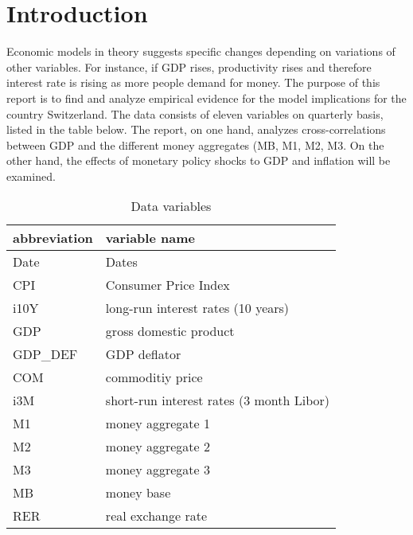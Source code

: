 \documentclass[11pt,a4paper]{report}
\begin{document}
\section*{Introduction}
Economic models in theory suggests specific changes depending on variations of other variables. For instance, if GDP rises, productivity rises and therefore interest rate is rising as more people demand for money. The purpose of this report is to find and analyze empirical evidence for the model implications for the country Switzerland. The data consists of eleven variables on quarterly basis, listed in the table below. The report, on one hand, analyzes cross-correlations between GDP and the different money aggregates (MB, M1, M2, M3. On the other hand, the effects of monetary policy shocks to GDP and inflation will be examined. 
\newline
\begin{table}[H]
\centering
\caption{Data variables}
\label{tab: var}
\begin{tabular}{l|l}
	\textbf{abbreviation} & \textbf{variable name}\\\hline\hline
	Date & Dates\\
	CPI & Consumer Price Index \\
	i10Y & long-run interest rates (10 years) \\
	GDP & gross domestic product\\
	GDP\_DEF & GDP deflator \\
	COM & commoditiy price \\
	i3M & short-run interest rates (3 month Libor) \\
	M1 & money aggregate 1 \\
	M2 & money aggregate 2 \\
	M3 & money aggregate 3 \\
	MB & money base \\
	RER & real exchange rate \\
\hline
\end{tabular}
\end{table}
 

\newpage
\end{document}
